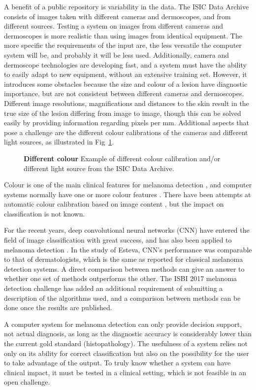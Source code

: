 \documentclass[10pt,letterpaper]{article}
\begin{document}
A benefit of a public repository is variability in the data. 
The ISIC Data Archive consists of images taken with different cameras and dermoscopes, and from different sources. 
Testing a system on images from different cameras and dermoscopes is more realistic than using images from identical equipment. 
The more specific the requirements of the input are, the less versatile the computer system will be, and probably it will be less used. 
Additionally, camera and dermoscope technologies are developing fast, and a system must have the ability to easily adapt to new equipment, without an extensive training set. 
However, it introduces some obstacles because the size and colour of a lesion have diagnostic importance, but are not consistent between different cameras and dermoscopes. 
Different image resolutions, magnifications and distances to the skin result in the true size of the lesion differing from image to image, though this can be solved easily by providing information regarding pixels per mm. 
Additional aspects that pose a challenge are the different colour calibrations of the cameras and different light sources, as illustrated in Fig~\ref{fig:Colour}. 
\begin{figure}[!h]
\caption{{\bf Different colour}
Example of different colour calibration and/or different light source from the ISIC Data Archive.}
\label{fig:Colour}
\end{figure}
Colour is one of the main clinical features for melanoma detection \cite{Argenziano2003Dermoscopy}, and computer systems normally have one or more colour features \cite{Korotkov2012Computerized}. 
There have been attempts at automatic colour calibration based on image content \cite{Iyatomi2011Automated}, but the impact on classification is not known. 

For the recent years, deep convolutional neural networks (CNN) have entered the field of image classification with great success, and has also been applied to melanoma detection \cite{Esteva2017Dermatologistlevel}. 
In the study of Esteva, CNN's performance was comparable to that of dermatologists, which is the same as reported for classical melanoma detection systems.
A direct comparison between methods can give an answer to whether one set of methods outperforms the other. 
The ISBI 2017 melanoma detection challenge has added an additional requirement of submitting a description of the algorithms used, and a comparison between methods can be done once the results are published. 

A computer system for melanoma detection can only provide decision support, not actual diagnosis, as long as the diagnostic accuracy is considerably lower than the current gold standard (histopathology). 
The usefulness of a system relies not only on its ability for correct classification but also on the possibility for the user to take advantage of the output. 
To truly know whether a system can have clinical impact, it must be tested in a clinical setting, which is not feasible in an open challenge. 
\end{document}
